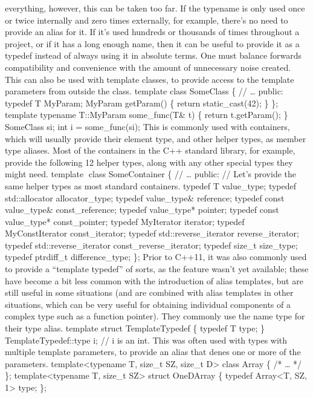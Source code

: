 everything, however, this can be taken too far. If the typename is only
used once or twice internally and zero times externally, for example,
there's no need to provide an alias for it. If it's used hundreds or
thousands of times throughout a project, or if it has a long enough
name, then it can be useful to provide it as a typedef instead of always
using it in absolute terms. One must balance forwards compatibility and
convenience with the amount of unnecessary noise created. This can also
be used with template classes, to provide access to the template
parameters from outside the class. template class SomeClass \{ //
\ldots{} public: typedef T MyParam; MyParam getParam() \{ return
static\_cast(42); \} \}; template typename T::MyParam some\_func(T\& t)
\{ return t.getParam(); \} SomeClass si; int i = some\_func(si); This is
commonly used with containers, which will usually provide their element
type, and other helper types, as member type aliases. Most of the
containers in the C++ standard library, for example, provide the
following 12 helper types, along with any other special types they might
need. template class SomeContainer \{ // \ldots{} public: // Let's
provide the same helper types as most standard containers. typedef T
value\_type; typedef std::allocator allocator\_type; typedef
value\_type\& reference; typedef const value\_type\& const\_reference;
typedef value\_type* pointer; typedef const value\_type* const\_pointer;
typedef MyIterator iterator; typedef MyConstIterator const\_iterator;
typedef std::reverse\_iterator reverse\_iterator; typedef
std::reverse\_iterator const\_reverse\_iterator; typedef size\_t
size\_type; typedef ptrdiff\_t difference\_type; \}; Prior to C++11, it
was also commonly used to provide a ``template typedef'' of sorts, as
the feature wasn't yet available; these have become a bit less common
with the introduction of alias templates, but are still useful in some
situations (and are combined with alias templates in other situations,
which can be very useful for obtaining individual components of a
complex type such as a function pointer). They commonly use the name
type for their type alias. template struct TemplateTypedef \{ typedef T
type; \} TemplateTypedef::type i; // i is an int. This was often used
with types with multiple template parameters, to provide an alias that
denes one or more of the parameters. template\textless typename T,
size\_t SZ, size\_t D\textgreater{} class Array \{ /* \ldots{} */ \};
template\textless typename T, size\_t SZ\textgreater{} struct OneDArray
\{ typedef Array\textless T, SZ, 1\textgreater{} type; \};
